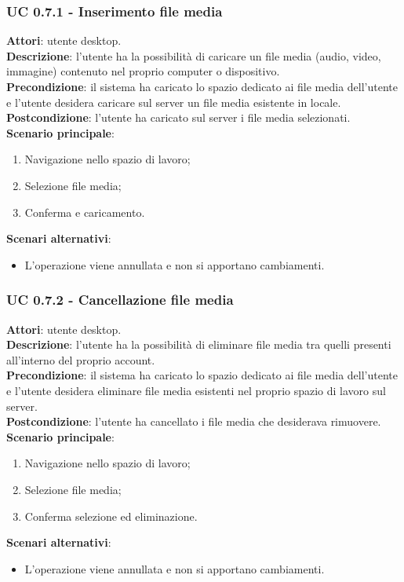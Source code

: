 \subsubsection{UC 0.7.1 - Inserimento file media}{
	\label{uc0.7.1}
	\textbf{Attori}: utente desktop. \\
	\textbf{Descrizione}: l'utente ha la possibilità di caricare un file media (audio, video, immagine) contenuto nel proprio computer o dispositivo. \\
	\textbf{Precondizione}: il sistema ha caricato lo spazio dedicato ai file media dell'utente e l'utente desidera caricare sul server un file media esistente in locale.	\\
	\textbf{Postcondizione}: l'utente ha caricato sul server i file media selezionati.	\\
	\textbf{Scenario principale}:
	\begin{enumerate}
		\item Navigazione nello spazio di lavoro;
		\item Selezione file media;
		\item Conferma e caricamento.
	\end{enumerate}
	\textbf{Scenari alternativi}: 
	\begin{itemize}
		\item L'operazione viene annullata e non si apportano cambiamenti.
	\end{itemize}
	}
	\subsubsection{UC 0.7.2 - Cancellazione file media}{
		\label{uc0.7.2}
		\textbf{Attori}: utente desktop.	\\
		\textbf{Descrizione}: l'utente ha la possibilità di eliminare file media tra quelli presenti all'interno del proprio account. \\
		\textbf{Precondizione}: il sistema ha caricato lo spazio dedicato ai file media dell'utente e l'utente desidera eliminare file media esistenti nel proprio spazio di lavoro sul server.	\\
		\textbf{Postcondizione}: l'utente ha cancellato i file media che desiderava rimuovere.	\\
		\textbf{Scenario principale}:
		\begin{enumerate}
			\item Navigazione nello spazio di lavoro;
			\item Selezione file media;
			\item Conferma selezione ed eliminazione.
		\end{enumerate}
		\textbf{Scenari alternativi}: 
		\begin{itemize}
			\item L'operazione viene annullata e non si apportano cambiamenti.
		\end{itemize}
		}
